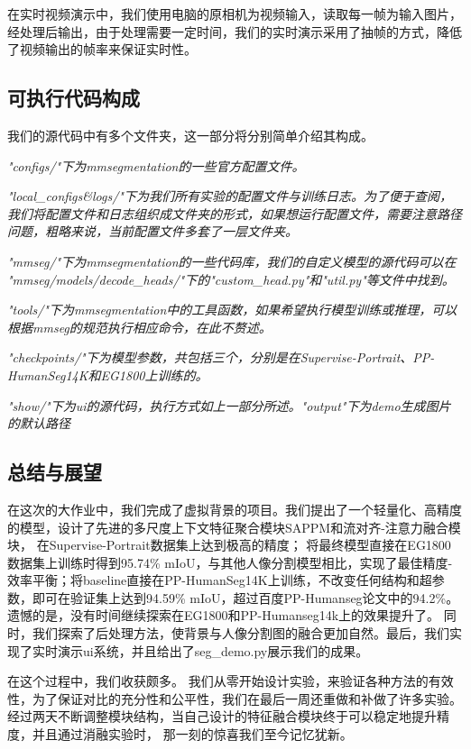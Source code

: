 \documentclass[11pt]{article}
\begin{document}
在实时视频演示中，我们使用电脑的原相机为视频输入，读取每一帧为输入图片，经处理后输出，由于处理需要一定时间，我们的实时演示采用了抽帧的方式，降低了视频输出的帧率来保证实时性。
\subsection{可执行代码构成}
我们的源代码中有多个文件夹，这一部分将分别简单介绍其构成。

\textit{"configs/"下为mmsegmentation的一些官方配置文件。}

\textit{"local_configs\&logs/"下为我们所有实验的配置文件与训练日志。为了便于查阅，我们将配置文件和日志组织成文件夹的形式，如果想运行配置文件，需要注意路径问题，粗略来说，当前配置文件多套了一层文件夹。}

\textit{"mmseg/"下为mmsegmentation的一些代码库，我们的自定义模型的源代码可以在
"mmseg/models/decode_heads/"下的"custom_head.py"和"util.py"等文件中找到。}

\textit{"tools/"下为mmsegmentation中的工具函数，如果希望执行模型训练或推理，可以根据mmseg的规范执行相应命令，在此不赘述。}

\textit{"checkpoints/"下为模型参数，共包括三个，分别是在Supervise-Portrait、PP-HumanSeg14K和EG1800上训练的。}

\textit{"show/"下为ui的源代码，执行方式如上一部分所述。"output"下为demo生成图片的默认路径}


\subsection{总结与展望}

在这次的大作业中，我们完成了虚拟背景的项目。我们提出了一个轻量化、高精度的模型，设计了先进的多尺度上下文特征聚合模块SAPPM和流对齐-注意力融合模块，
在Supervise-Portrait数据集上达到极高的精度；
将最终模型直接在EG1800数据集上训练时得到95.74\% mIoU，与其他人像分割模型相比，实现了最佳精度-效率平衡；将baseline直接在PP-HumanSeg14K上训练，不改变任何结构和超参数，即可在验证集上达到94.59\% mIoU，超过百度PP-Humanseg论文中的94.2\%。遗憾的是，没有时间继续探索在EG1800和PP-Humanseg14k上的效果提升了。
同时，我们探索了后处理方法，使背景与人像分割图的融合更加自然。最后，我们实现了实时演示ui系统，并且给出了seg_demo.py展示我们的成果。

在这个过程中，我们收获颇多。
我们从零开始设计实验，来验证各种方法的有效性，为了保证对比的充分性和公平性，我们在最后一周还重做和补做了许多实验。
经过两天不断调整模块结构，当自己设计的特征融合模块终于可以稳定地提升精度，并且通过消融实验时，
那一刻的惊喜我们至今记忆犹新。
\end{document}
